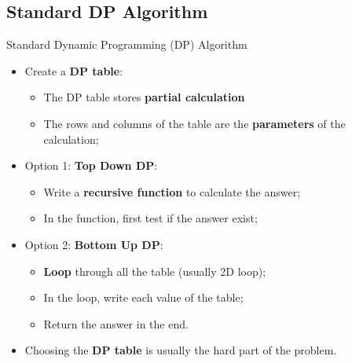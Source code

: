 \subsection{Standard DP Algorithm}
\begin{frame}{Standard Dynamic Programming (DP) Algorithm}

  \begin{block}{}
    \begin{itemize}
      \item Create a {\bf DP table}:
      \begin{itemize}
        \item The DP table stores {\bf partial calculation}
        \item The rows and columns of the table are the {\bf parameters} of the calculation;
      \end{itemize}\medskip

      \item Option 1: {\bf Top Down DP}:
      \begin{itemize}
        \item Write a {\bf recursive function} to calculate the answer;
        \item In the function, first test if the answer exist;
      \end{itemize}\medskip

      \item Option 2: {\bf Bottom Up DP}:
      \begin{itemize}
        \item {\bf Loop} through all the table (usually 2D loop);
        \item In the loop, write each value of the table;
        \item Return the answer in the end.
      \end{itemize}\medskip

      \item Choosing the {\bf DP table} is usually the hard part of the problem.
    \end{itemize}
  \end{block}
\end{frame}

